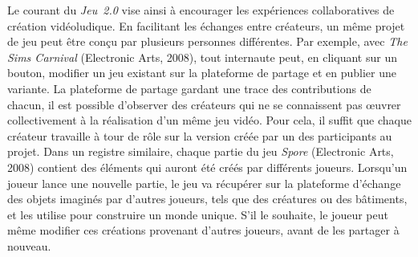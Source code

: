 \documentclass{FramateX}
\begin{document}
\begin{refsection}
Le courant du \textit{Jeu~2.0} vise ainsi à
encourager les expériences collaboratives de création vidéoludique. En
facilitant les échanges entre créateurs, un même projet de jeu peut
être conçu par plusieurs personnes différentes. Par exemple, avec
\textit{The Sims Carnival} (Electronic Arts,
2008), tout internaute peut, en
cliquant sur un bouton, modifier un jeu existant sur la plateforme de
partage et en publier une variante. La plateforme de partage gardant
une trace des contributions de chacun, il est possible d'observer des
créateurs qui ne se connaissent pas œuvrer collectivement à la
réalisation d'un même jeu vidéo. Pour cela, il suffit que chaque
créateur travaille à tour de rôle sur la version créée par un des
participants au projet. Dans un registre similaire, chaque partie du
jeu \textit{Spore} (Electronic Arts, 2008)
contient des éléments qui auront été créés par différents joueurs.
Lorsqu'un joueur lance une nouvelle partie, le jeu va récupérer sur la
plateforme d'échange des objets imaginés par d'autres joueurs, tels que
des créatures ou des bâtiments, et les utilise pour construire un monde
unique. S'il le souhaite, le joueur peut même modifier ces créations
provenant d'autres joueurs, avant de les partager à nouveau.


\end{refsection}
\end{document}
